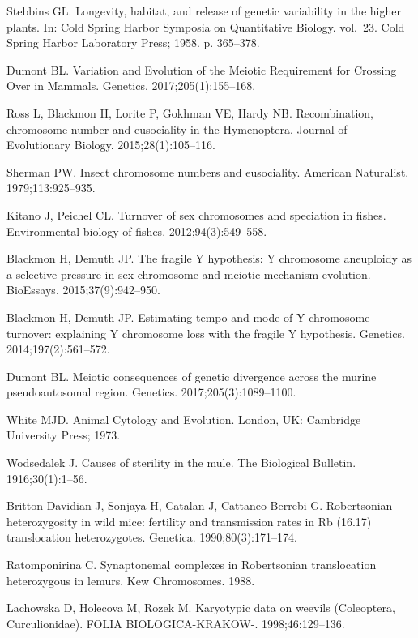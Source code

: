 \documentclass[]{rsos}%
\begin{document}
\begin{thebibliography}{99}
Stebbins GL.
 Longevity, habitat, and release of genetic variability in the higher
  plants.
 In: Cold Spring Harbor Symposia on Quantitative Biology. vol.~23.
  Cold Spring Harbor Laboratory Press; 1958. p. 365--378.

Dumont BL.
 Variation and Evolution of the Meiotic Requirement for Crossing Over
  in Mammals.
 Genetics. 2017;205(1):155--168.

Ross L, Blackmon H, Lorite P, Gokhman VE, Hardy NB.
 Recombination, chromosome number and eusociality in the
  {H}ymenoptera.
 Journal of Evolutionary Biology. 2015;28(1):105--116.

Sherman PW.
 Insect chromosome numbers and eusociality.
 American Naturalist. 1979;113:925--935.

Kitano J, Peichel CL.
 Turnover of sex chromosomes and speciation in fishes.
 Environmental biology of fishes. 2012;94(3):549--558.

Blackmon H, Demuth JP.
 The fragile Y hypothesis: Y chromosome aneuploidy as a selective
  pressure in sex chromosome and meiotic mechanism evolution.
 BioEssays. 2015;37(9):942--950.

Blackmon H, Demuth JP.
 Estimating tempo and mode of Y chromosome turnover: explaining Y
  chromosome loss with the fragile Y hypothesis.
 Genetics. 2014;197(2):561--572.

Dumont BL.
 Meiotic consequences of genetic divergence across the murine
  pseudoautosomal region.
 Genetics. 2017;205(3):1089--1100.

White MJD.
 Animal Cytology and Evolution.
 London, UK: Cambridge University Press; 1973.

Wodsedalek J.
 Causes of sterility in the mule.
 The Biological Bulletin. 1916;30(1):1--56.

Britton-Davidian J, Sonjaya H, Catalan J, Cattaneo-Berrebi G.
 Robertsonian heterozygosity in wild mice: fertility and transmission
  rates in Rb (16.17) translocation heterozygotes.
 Genetica. 1990;80(3):171--174.

Ratomponirina C.
 Synaptonemal complexes in Robertsonian translocation heterozygous in
  lemurs.
 Kew Chromosomes. 1988.

Lachowska D, Holecova M, Rozek M.
 Karyotypic data on weevils (Coleoptera, Curculionidae).
 FOLIA BIOLOGICA-KRAKOW-. 1998;46:129--136.


\end{thebibliography}
\end{document}
